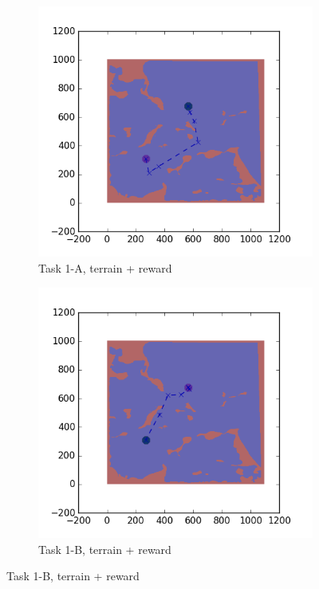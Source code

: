 \documentclass{tamuccthesis}
\begin{document}
\begin{figure}
    \begin{subfigure}[b]{0.4\textwidth}
        \centering
        \includegraphics[width=\textwidth,trim={3cm 3cm 3cm 3cm},clip]{EXP3RG_PathAa_-1_-1_0_-1.png}
        \caption{{\small Task 1-A, terrain + reward}}    
        \label{fig:Path_1-A_terrain_reward}
    \end{subfigure}
    \hfill
    \begin{subfigure}[b]{0.4\textwidth}  
        \centering 
        \includegraphics[width=\textwidth,trim={3cm 3cm 3cm 3cm},clip]{EXP3RG_PathAb_-1_-1_0_-1.png}
        \caption{{\small Task 1-B, terrain + reward}}   
        \label{fig:Path_1-B_terrain_reward}
    \end{subfigure}
   

\end{figure}
\end{document}
